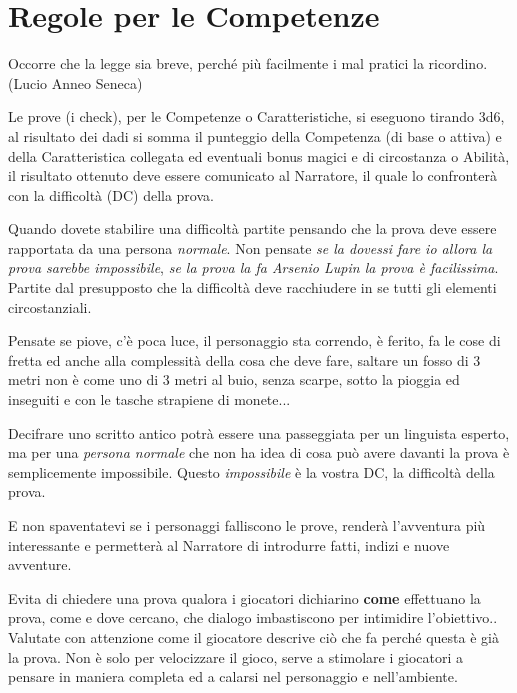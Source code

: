 \section{Regole per le Competenze}

\begin{changemargin}{0.3cm}{0.3cm}\begin{enfasi}{
Occorre che la legge sia breve, perché più facilmente i mal pratici la ricordino. (Lucio Anneo Seneca)}\end{enfasi}\end{changemargin}

\begin{multicols}{2}

Le prove (i check), per le Competenze o Caratteristiche, si eseguono tirando 3d6, al risultato dei dadi si somma il punteggio della Competenza (di base o attiva) e della Caratteristica collegata ed eventuali bonus magici e di circostanza o Abilità, il risultato ottenuto deve essere comunicato al Narratore, il quale lo confronterà con la difficoltà (DC) della prova.

Quando dovete stabilire una difficoltà partite pensando che la prova deve essere rapportata da una persona \emph{normale}. Non pensate \emph{se la dovessi fare io allora la prova sarebbe impossibile}, \emph{se la prova la fa Arsenio Lupin la prova è facilissima}. Partite dal presupposto che la difficoltà deve racchiudere in se tutti gli elementi circostanziali.

Pensate se piove, c'è poca luce, il personaggio sta correndo, è ferito, fa le cose di fretta ed anche alla complessità della cosa che deve fare, saltare un fosso di 3 metri non è come uno di 3 metri al buio, senza scarpe, sotto la pioggia ed inseguiti e con le tasche strapiene di monete...

Decifrare uno scritto antico potrà essere una passeggiata per un linguista esperto, ma per una \emph{persona normale} che non ha idea di cosa può avere davanti la prova è semplicemente impossibile. Questo \emph{impossibile} è la vostra DC, la difficoltà della prova.

E non spaventatevi se i personaggi falliscono le prove, renderà l'avventura più interessante e permetterà al Narratore di introdurre fatti, indizi e nuove avventure.

\begin{changemargin}{0.3cm}{0.3cm}\begin{narratore}
Evita di chiedere una prova qualora i giocatori dichiarino \textbf{come} effettuano la prova, come e dove cercano, che dialogo imbastiscono per intimidire l'obiettivo.. Valutate con attenzione come il giocatore descrive ciò che fa perché questa è già la prova. Non è solo per velocizzare il gioco, serve a stimolare i giocatori a pensare in maniera completa ed a calarsi nel personaggio e nell'ambiente.


\end{narratore}
\end{changemargin}
\end{multicols}
